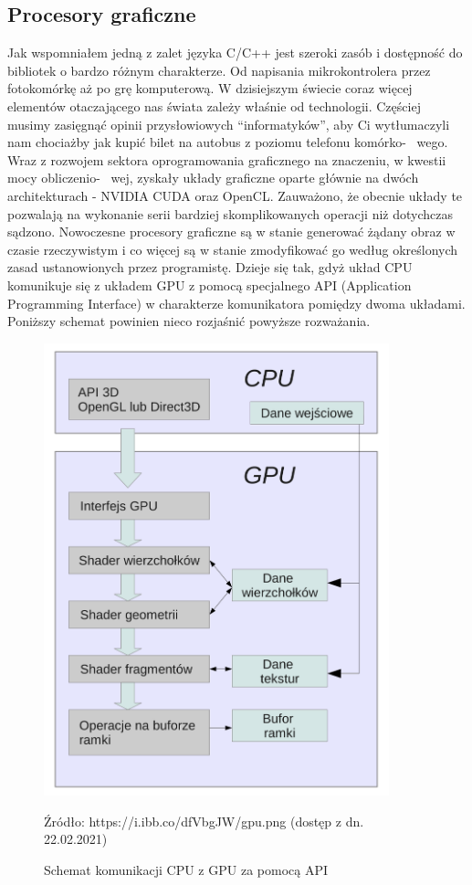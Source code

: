 \documentclass{article}
\begin{document}
	\subsection{Procesory graficzne}
	Jak wspomniałem jedną z zalet języka C/C++ jest szeroki zasób i dostępność do bibliotek o bardzo różnym charakterze. Od napisania mikrokontrolera przez fotokomórkę aż po grę komputerową. W dzisiejszym świecie coraz więcej elementów otaczającego nas świata zależy właśnie od technologii. Częściej musimy zasięgnąć opinii przysłowiowych “informatyków”, aby Ci wytłumaczyli nam chociażby jak kupić bilet na autobus z poziomu telefonu komórko- \ wego. Wraz z rozwojem sektora oprogramowania graficznego na znaczeniu, w kwestii mocy obliczenio- \ wej, zyskały układy graficzne oparte głównie na dwóch architekturach - NVIDIA CUDA oraz OpenCL. Zauważono, że obecnie układy te pozwalają na wykonanie serii bardziej skomplikowanych operacji niż dotychczas sądzono. Nowoczesne procesory graficzne są w stanie generować żądany obraz w czasie rzeczywistym i co więcej są w stanie zmodyfikować go według określonych zasad ustanowionych przez programistę. Dzieje się tak, gdyż układ CPU komunikuje się z układem GPU z pomocą specjalnego API (Application Programming Interface) w charakterze komunikatora pomiędzy dwoma układami. Poniższy schemat powinien nieco rozjaśnić powyższe rozważania.
	\begin{figure}
		\centering
		\includegraphics[width=10cm]{gpu}
		\caption{Schemat komunikacji CPU z GPU za pomocą API}
		Źródło: https://i.ibb.co/dfVbgJW/gpu.png (dostęp z dn. 22.02.2021)
	\end{figure}
\end{document}
